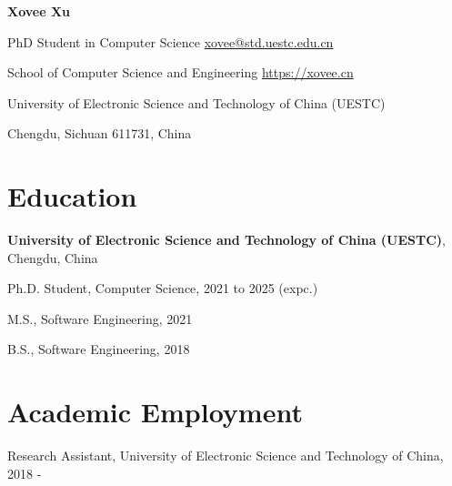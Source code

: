 \documentclass{article}
\begin{document}
\begin{center}
    \vspace*{5pt}
    \Huge{
    \textbf{Xovee Xu}}
\end{center}
\vspace{15pt}



\setlength{\parskip}{1pt}

\noindent PhD Student in Computer Science \hfill \href{mailto:xovee@std.uestc.edu.cn}{xovee@std.uestc.edu.cn}

\noindent School of Computer Science and Engineering \hfill \url{https://xovee.cn}

\noindent University of Electronic Science and Technology of China (UESTC)

\noindent Chengdu, Sichuan 611731, China


\setlength{\parskip}{3pt}

\section*{Education}
\indent 

\textbf{University of Electronic Science and Technology of China (UESTC)}, Chengdu, China

\hspace{2em}Ph.D. Student, Computer Science, 2021 to 2025 (expc.)

\hspace{2em}M.S., Software Engineering, 2021

\hspace{2em}B.S., Software Engineering, 2018




\section*{Academic Employment}
\indent

Research Assistant, University of Electronic Science and Technology of China, 2018 -
\end{document}
